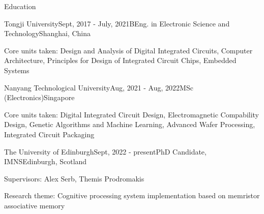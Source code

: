\documentclass{resume} %
\begin{document}

\begin{rSection}{Education}
	
	\begin{rSubsection}{Tongji University}{Sept, 2017 - July, 2021}{BEng. in Electronic Science and Technology}{Shanghai, China}
		\item Core units taken: Design and Analysis of Digital Integrated Circuits, Computer Architecture, Principles for Design of Integrated Circuit Chips, Embedded Systems
	\end{rSubsection}

	\begin{rSubsection}{Nanyang Technological University}{Aug, 2021 - Aug, 2022}{MSc (Electronics)}{Singapore}
		\item Core units taken: Digital Integrated Circuit Design, Electromagnetic Compability Design, Genetic Algorithms and Machine Learning, Advanced Wafer Processing, Integrated Circuit Packaging
	\end{rSubsection}

	\begin{rSubsection}{The University of Edinburgh}{Sept, 2022 - present}{PhD Candidate, IMNS}{Edinburgh, Scotland}
		\item Supervisors: Alex Serb, Themis Prodromakis
		\item Research theme: Cognitive processing system implementation based on memristor associative memory
	\end{rSubsection}

\end{rSection}
\end{document}
